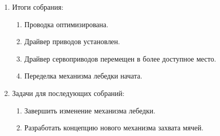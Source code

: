 \begin{enumerate}
\begin{enumerate}
	\end{enumerate}
	
	\item Итоги собрания: 
	\begin{enumerate}
		\item Проводка оптимизирована.
		
		\item Драйвер приводов установлен.
		
		\item Драйвер сервоприводов перемещен в более доступное место.
		
		\item Переделка механизма лебедки начата.
		
	\end{enumerate}
	
	\item Задачи для последующих собраний:
	\begin{enumerate}
		\item Завершить изменение механизма лебедки.
		
		\item Разработать концепцию нового механизма захвата мячей.
		
	\end{enumerate}     
\end{enumerate}
\fillpage